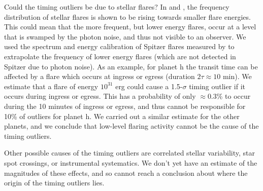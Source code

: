 \documentclass[twocolumn]{aastex63}
\begin{document}
Could the timing outliers be due to stellar flares?  In \citet{Vida_2017} and \citet{Ducrot2020}, the frequency distribution of stellar flares is shown to be rising towards smaller flare energies.  This could mean that the more frequent, but lower energy flares, occur at a level that is swamped by the photon noise, and thus not visible to an observer.  We used the spectrum and energy calibration of Spitzer flares measured by \citet{Ducrot2020} to extrapolate the frequency of lower energy flares (which are not detected in Spitzer due to photon noise).  As an example, for planet h the transit time can be affected by a flare which occurs at ingress or egress (duration $2\tau \approx 10$ min).  %
We estimate that a flare of energy $10^{31}$ erg could cause a 1.5-$\sigma$
timing outlier if it occurs during ingress or egress.  This has a probability of only $\approx 0.3$\% to occur during the 10 minutes of ingress or egress,
and thus cannot be responsible for 10\% of outliers for planet h.  We carried out a similar estimate for
the other planets, and we conclude that low-level flaring activity cannot be the cause of the timing outliers.

Other possible causes of the timing outliers are correlated stellar variability, star spot crossings, or instrumental systematics.  We don't yet have an estimate of the magnitudes of these effects, and so cannot reach a conclusion about where the origin of the timing outliers lies.




\end{document}

